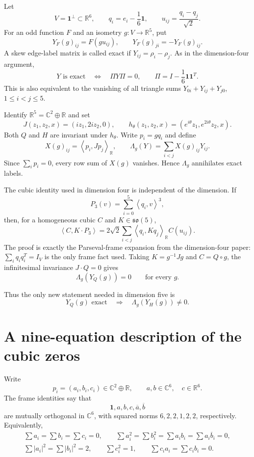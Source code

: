 \documentclass[11pt,reqno]{amsart}
\theoremstyle{remark}
\newcommand{\R}{\mathbb R}
\newcommand{\C}{\mathbb C}
\newcommand{\one}{\mathbf 1}
\newcommand{\ip}[2]{\left\langle #1,#2\right\rangle}
\newcommand{\abs}[1]{\left\lvert #1\right\rvert}
\begin{document}
Let
\[
 V=\one^\perp\subset\R^6,\qquad
 q_i=e_i-\frac16\one,\qquad
 u_{ij}=\frac{q_i-q_j}{\sqrt2}.
\]
For an odd function $F$ and an isometry $g:V\to\R^5$, put
\[
 Y_F(g)_{ij}=F(gu_{ij}),\qquad Y_F(g)_{ji}=-Y_F(g)_{ij}.
\]
A skew edge-label matrix is called exact if
$Y_{ij}=\rho_i-\rho_j$.  As in the dimension-four argument,
\begin{equation}\label{eq:exact}
 Y\text{ is exact}\quad\Longleftrightarrow\quad
 \Pi Y\Pi=0,\qquad
 \Pi=I-\frac16\one\one^T.
\end{equation}
This is also equivalent to the vanishing of all triangle sums
$Y_{0i}+Y_{ij}+Y_{j0}$, $1\le i<j\le5$.

Identify $\R^5=\C^2\oplus\R$ and set
\[
 J(z_1,z_2,x)=(iz_1,2iz_2,0),\qquad
 h_\theta(z_1,z_2,x)=(e^{i\theta}z_1,e^{2i\theta}z_2,x).
\]
Both $Q$ and $H$ are invariant under $h_\theta$.  Write $p_i=gq_i$ and define
\[
 X(g)_{ij}=\ip{p_i}{Jp_j}_{\R},\qquad
 \Lambda_g(Y)=\sum_{i<j}X(g)_{ij}Y_{ij}.
\]
Since $\sum_i p_i=0$, every row sum of $X(g)$ vanishes.  Hence
$\Lambda_g$ annihilates exact labels.

The cubic identity used in dimension four is independent of the dimension.
If
\[
 P_3(v)=\sum_{i=0}^5\ip{q_i}{v}^3,
\]
then, for a homogeneous cubic $C$ and $K\in\mathfrak{so}(5)$,
\begin{equation}\label{eq:cubicidentity}
 \ip{C}{K\cdot P_3}
 =2\sqrt2\sum_{i<j}\ip{q_i}{Kq_j}_{\R}C(u_{ij}).
\end{equation}
The proof is exactly the Parseval-frame expansion from the dimension-four
paper: $\sum_iq_iq_i^T=I_V$ is the only frame fact used.  Taking
$K=g^{-1}Jg$ and $C=Q\circ g$, the infinitesimal invariance $J\cdot Q=0$
gives
\begin{equation}\label{eq:globalzero}
 \Lambda_g(Y_Q(g))=0\qquad\text{for every }g.
\end{equation}

Thus the only new statement needed in dimension five is
\begin{equation}\label{eq:target}
 Y_Q(g)\text{ exact}\quad\Longrightarrow\quad
 \Lambda_g(Y_H(g))\ne0.
\end{equation}

\section{A nine-equation description of the cubic zeros}

Write
\[
 p_i=(a_i,b_i,c_i)\in\C^2\oplus\R,
 \qquad a,b\in\C^6,\quad c\in\R^6.
\]
The frame identities say that
\[
 \one,a,b,c,\overline a,\overline b
\]
are mutually orthogonal in $\C^6$, with squared norms
$6,2,2,1,2,2$, respectively.  Equivalently,
\begin{gather*}
 \sum a_i=\sum b_i=\sum c_i=0,\qquad
 \sum a_i^2=\sum b_i^2=\sum a_ib_i=\sum a_i\overline b_i=0,\\
 \sum\abs{a_i}^2=\sum\abs{b_i}^2=2,\qquad
 \sum c_i^2=1,\qquad
 \sum c_ia_i=\sum c_ib_i=0.
\end{gather*}
\end{document}
